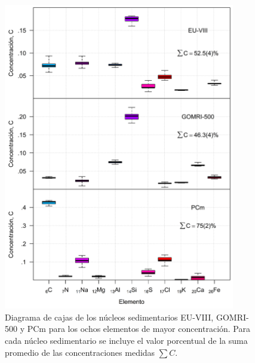 \begin{figure}
\centering
\includegraphics[width=0.9\textwidth]{Imagenes/XRF_Todos_Los_Nucleos_1.png}
\caption{Diagrama de cajas de los núcleos sedimentarios EU-VIII, GOMRI-500 y PCm para los ochos elementos de mayor concentración. Para cada núcleo sedimentario se incluye el valor porcentual de la suma promedio de las concentraciones medidas $\sum C$.}\label{Fig-ConcentracionNucleos1}
\end{figure}
